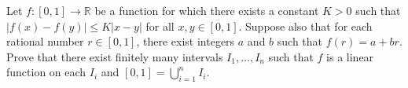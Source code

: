 Let $f: [0,1] \to \mathbb{R}$ be a function for which there exists a constant $K>0$
such that $\left| f(x) - f(y) \right| \leq K \left| x - y \right|$ for all $x,y \in [0,1]$.
Suppose also that for each rational number $r \in [0,1]$, there exist integers $a$ and $b$
such that $f(r) = a + br$. Prove that there exist finitely many intervals $I_1, \dots, I_n$
such that $f$ is a linear function on each $I_i$ and $[0,1] = \bigcup_{i=1}^n I_i$. 

